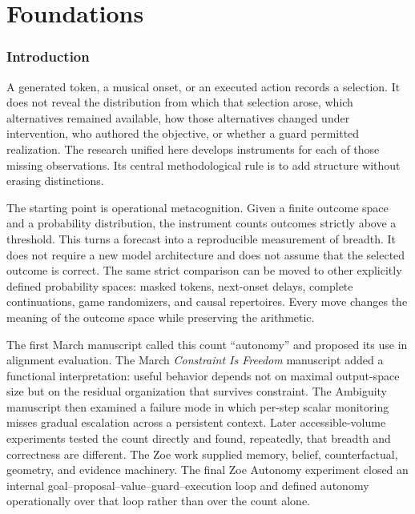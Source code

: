 \clearpage
\part{Foundations}

\section{Introduction}
A generated token, a musical onset, or an executed action records a selection. It does not reveal the distribution from which that selection arose, which alternatives remained available, how those alternatives changed under intervention, who authored the objective, or whether a guard permitted realization. The research unified here develops instruments for each of those missing observations. Its central methodological rule is to add structure without erasing distinctions.

The starting point is operational metacognition. Given a finite outcome space and a probability distribution, the instrument counts outcomes strictly above a threshold. This turns a forecast into a reproducible measurement of breadth. It does not require a new model architecture and does not assume that the selected outcome is correct. The same strict comparison can be moved to other explicitly defined probability spaces: masked tokens, next-onset delays, complete continuations, game randomizers, and causal repertoires. Every move changes the meaning of the outcome space while preserving the arithmetic.

The first March manuscript called this count ``autonomy'' and proposed its use in alignment evaluation. The March \emph{Constraint Is Freedom} manuscript added a functional interpretation: useful behavior depends not on maximal output-space size but on the residual organization that survives constraint. The Ambiguity manuscript then examined a failure mode in which per-step scalar monitoring misses gradual escalation across a persistent context. Later accessible-volume experiments tested the count directly and found, repeatedly, that breadth and correctness are different. The Zoe work supplied memory, belief, counterfactual, geometry, and evidence machinery. The final Zoe Autonomy experiment closed an internal goal--proposal--value--guard--execution loop and defined autonomy operationally over that loop rather than over the count alone.

